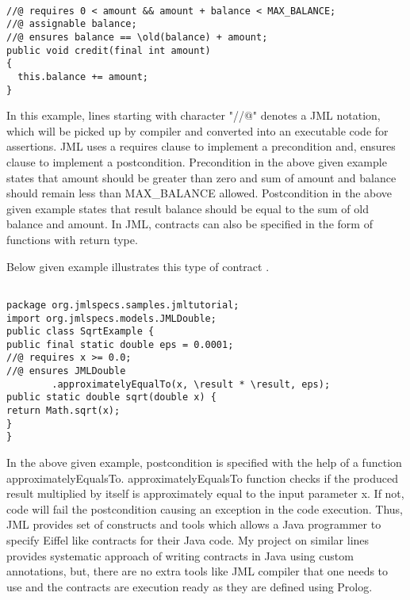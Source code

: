 \begin{minipage}{\linewidth}
\lstset{language=Java, caption=JML Contract Example, captionpos=b, breaklines=true}       
\begin{lstlisting}[frame=single]

//@ requires 0 < amount && amount + balance < MAX_BALANCE;
//@ assignable balance;
//@ ensures balance == \old(balance) + amount;
public void credit(final int amount)
{
  this.balance += amount;
}

\end{lstlisting}
\end{minipage}

In this example, lines starting with character "//@" denotes a JML notation, which will be picked up by compiler and converted into an executable code for assertions.
JML uses a requires clause to implement a precondition and, ensures clause to implement a postcondition.
Precondition in the above given example states that amount should be greater than zero and sum of amount and balance should remain less than MAX\_BALANCE allowed.
Postcondition in the above given example states that result balance should be equal to the sum of old balance and amount.
In JML, contracts can also be specified in the form of functions with return type. 
\begin{minipage}{\linewidth}
Below given example illustrates this type of contract \cite{leavens2006design}.

\lstset{language=Java, caption=JML Contract Example with JML function, captionpos=b, breaklines=true}       
\begin{lstlisting}[frame=single]

package org.jmlspecs.samples.jmltutorial;
import org.jmlspecs.models.JMLDouble;
public class SqrtExample {
public final static double eps = 0.0001;
//@ requires x >= 0.0;
//@ ensures JMLDouble
		.approximatelyEqualTo(x, \result * \result, eps);
public static double sqrt(double x) {
return Math.sqrt(x);
}
}

\end{lstlisting}
\end{minipage}


In the above given example, postcondition is specified with the help of a function approximatelyEqualsTo. approximatelyEqualsTo function checks if the produced result multiplied by itself is approximately equal to the input parameter x. If not, code will fail the postcondition causing an exception in the code execution. \linebreak
Thus, JML provides set of constructs and tools which allows a Java programmer to specify Eiffel like contracts for their Java code. My project on similar lines provides systematic approach of writing contracts in Java using custom annotations, but, there are no extra tools like JML compiler that one needs to use and the contracts are execution ready as they are defined using Prolog.

